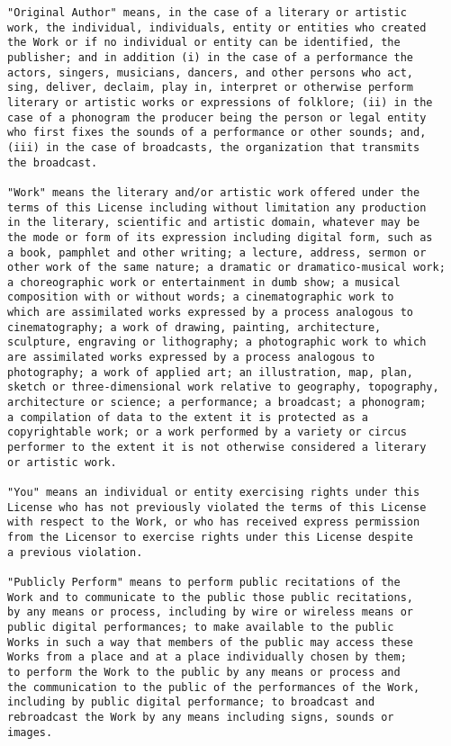 \begin{verbatim}
"Original Author" means, in the case of a literary or artistic
work, the individual, individuals, entity or entities who created
the Work or if no individual or entity can be identified, the
publisher; and in addition (i) in the case of a performance the
actors, singers, musicians, dancers, and other persons who act,
sing, deliver, declaim, play in, interpret or otherwise perform
literary or artistic works or expressions of folklore; (ii) in the
case of a phonogram the producer being the person or legal entity
who first fixes the sounds of a performance or other sounds; and,
(iii) in the case of broadcasts, the organization that transmits
the broadcast.

"Work" means the literary and/or artistic work offered under the
terms of this License including without limitation any production
in the literary, scientific and artistic domain, whatever may be
the mode or form of its expression including digital form, such as
a book, pamphlet and other writing; a lecture, address, sermon or
other work of the same nature; a dramatic or dramatico-musical work;
a choreographic work or entertainment in dumb show; a musical
composition with or without words; a cinematographic work to
which are assimilated works expressed by a process analogous to
cinematography; a work of drawing, painting, architecture,
sculpture, engraving or lithography; a photographic work to which
are assimilated works expressed by a process analogous to
photography; a work of applied art; an illustration, map, plan,
sketch or three-dimensional work relative to geography, topography,
architecture or science; a performance; a broadcast; a phonogram;
a compilation of data to the extent it is protected as a
copyrightable work; or a work performed by a variety or circus
performer to the extent it is not otherwise considered a literary
or artistic work.

"You" means an individual or entity exercising rights under this
License who has not previously violated the terms of this License
with respect to the Work, or who has received express permission
from the Licensor to exercise rights under this License despite
a previous violation.

"Publicly Perform" means to perform public recitations of the
Work and to communicate to the public those public recitations,
by any means or process, including by wire or wireless means or
public digital performances; to make available to the public
Works in such a way that members of the public may access these
Works from a place and at a place individually chosen by them;
to perform the Work to the public by any means or process and
the communication to the public of the performances of the Work,
including by public digital performance; to broadcast and
rebroadcast the Work by any means including signs, sounds or
images.


\end{verbatim}
